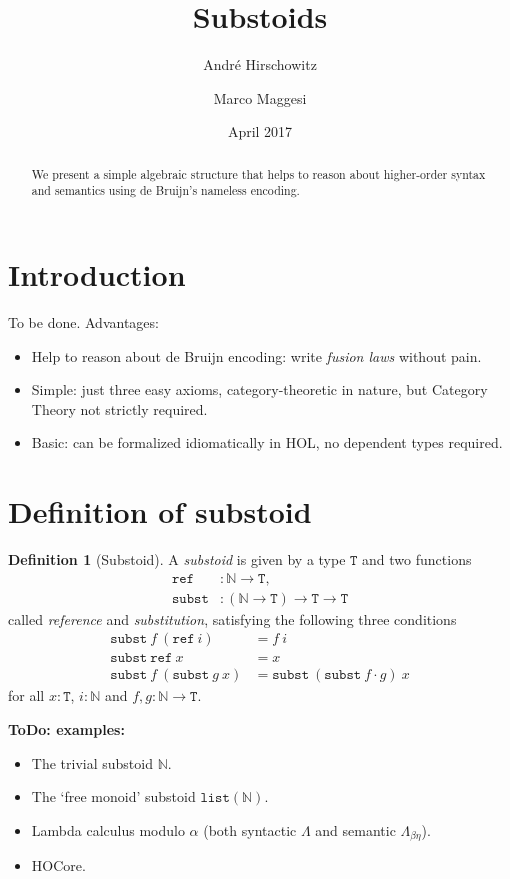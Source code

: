 \documentclass[a4paper,twoside,12pt]{article}
\title{Substoids}
\author{Andr\'e Hirschowitz \and Marco Maggesi}
\date{April 2017}
\theoremstyle{definition}
\newtheorem{definition}{Definition}
\theoremstyle{remark}
\newcommand{\NN}{\mathbb{N}}
\newcommand{\subst}{\mathtt{subst}}
\newcommand{\refe}{\mathtt{ref}}
\newcommand{\TT}{\mathtt{T}}
\begin{document}
\maketitle

\begin{abstract}
  We present a simple algebraic structure that helps to reason about
  higher-order syntax and semantics using de Bruijn's nameless
  encoding.
\end{abstract}

\section{Introduction}
\label{sec:intro}
To be done.
Advantages:
\begin{itemize}
\item Help to reason about de Bruijn encoding: write \emph{fusion
    laws} without pain.
\item Simple: just three easy axioms, category-theoretic in nature,
  but Category Theory not strictly required.
\item Basic: can be formalized idiomatically in HOL, no dependent
  types required.
\end{itemize}

\section{Definition of substoid}
\label{sec:definition-substoid}

\begin{definition}[Substoid]
  A \emph{substoid} is given by a type $\TT$ and two functions
  \begin{align*}
    \mathtt{ref} &\colon \NN \to \TT, \\
    \mathtt{subst} &\colon (\NN \to \TT) \to \TT \to \TT
  \end{align*}
  called \emph{reference} and \emph{substitution}, satisfying the
  following three conditions
  \begin{align*}
    \subst\ f\ (\refe\ i) &=  f\ i \\
    \subst\ \refe\ x &=  x \\
    \subst\ f\ (\subst\ g\ x) &= \subst\ (\subst\ f \cdot g)\ x
  \end{align*}
  for all $x : \TT$, $i :\NN$ and $f,g\colon \NN \to \TT$.
\end{definition}

\textbf{ToDo: examples:}
\begin{itemize}
\item The trivial substoid $\NN$.
\item The `free monoid' substoid $\mathtt{list}(\NN)$.
\item Lambda calculus modulo $\alpha$ (both syntactic $\Lambda$ and
  semantic $\Lambda_{\beta\eta}$).
\item HOCore.
\end{itemize}
\end{document}
